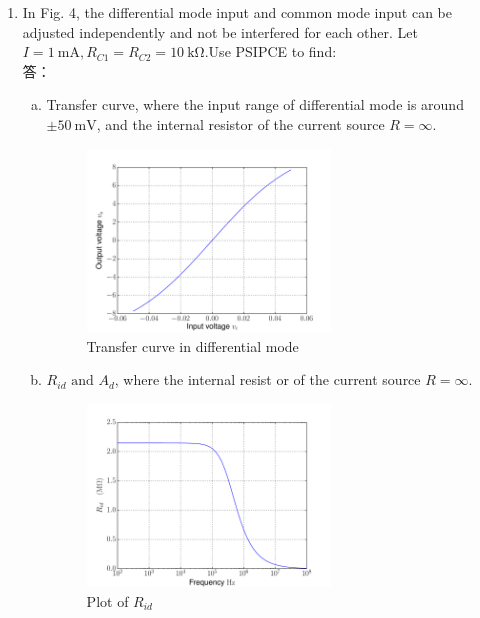 \documentclass[12pt, a4paper]{article}
\begin{document}
\begin{enumerate}[itemsep=20pt, topsep=10pt]

  \item {In Fig. 4, the differential mode input and common mode input can be adjusted independently and not be interfered for each other.
    Let $I = \SI{1}\mA, R_{C1} = R_{C2} = \SI{10}\kohm$.Use PSIPCE to find: } \\[10pt]
    答：
    \begin{enumerate}[(a)]
      \item Transfer curve, where the input range of differential mode is around $\pm \SI{50}\mV$,
        and the internal resistor of the current source $R = \infty$. 
        \begin{figure}[H]
          \centering
          \includegraphics[width=0.65\textwidth]{ngspice/ad_vv.pdf}
          \caption{Transfer curve in differential mode}
          \label{fig:}
        \end{figure}

      \item $R_{id} \text{ and } A_d$, where the internal resist or of the current source $R=\infty$.
        \begin{figure}[H]
          \centering
          \includegraphics[width=0.65\textwidth]{ngspice/ad_r.pdf}
          \caption{Plot of $R_{id}$}
          \label{fig:}
        \end{figure}


\end{enumerate}
\end{enumerate}
\end{document}
